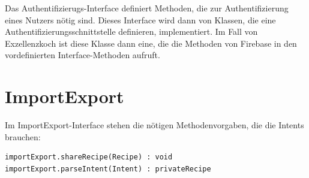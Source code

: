 Das Authentifizierugs-Interface definiert Methoden, die zur Authentifizierung eines Nutzers nötig sind. Dieses Interface wird dann von Klassen, die eine Authentifizierungsschnittstelle definieren, implementiert. Im Fall von Exzellenzkoch ist diese Klasse dann eine, die die Methoden von Firebase in den vordefinierten Interface-Methoden aufruft.

\section{ImportExport}

Im ImportExport-Interface stehen die nötigen Methodenvorgaben, die die Intents brauchen: 
\begin{lstlisting}
importExport.shareRecipe(Recipe) : void
importExport.parseIntent(Intent) : privateRecipe
\end{lstlisting}